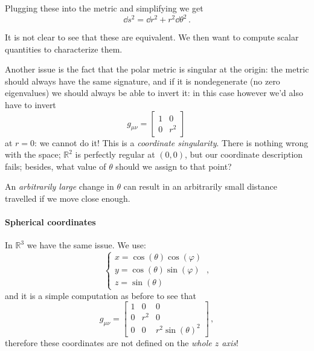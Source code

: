 \documentclass[main.tex]{subfiles}
\begin{document}
Plugging these into the metric and simplifying we get 
%
\begin{equation}
  \dd{s^2}  = \dd{r^2} + r^2 \dd{\theta^2} 
\,.
\end{equation}
%

It is not clear to see that these are equivalent.
We then want to compute scalar quantities to characterize them.

Another issue is the fact that the polar metric is singular at the origin: the metric should always have the same signature, and if it is nondegenerate (no zero eigenvalues) we should always be able to invert it: in this case however we'd also have to invert 
%
\begin{equation}
  g_{\mu \nu } = \left[\begin{array}{cc}
  1 & 0 \\ 
  0 & r^2
  \end{array}\right]
\,
\end{equation}
%
at \(r=0\): we cannot do it! This is a \emph{coordinate singularity}. There is nothing wrong with the space; \(\mathbb{R}^{2} \) is perfectly regular at \((0,0)\), but our coordinate description fails; besides, what value of \(\theta \) should we assign to that point? 

An \emph{arbitrarily large} change in \(\theta \) can result in an arbitrarily small distance travelled if we move close enough. 

\paragraph{Spherical coordinates}
In \(\mathbb{R}^3 \) we have the same issue. We use: 
%
\begin{equation}
  \begin{cases}
      x = \cos(\theta ) \cos(\varphi ) \\
      y = \cos(\theta ) \sin(\varphi)  \\
      z = \sin(\theta ) 
  \end{cases}
\,,
\end{equation}
%
and it is a simple computation as before to see that 
%
\begin{equation}
  g_{\mu \nu }= \left[\begin{array}{ccc}
  1 & 0 & 0 \\ 
  0 & r^2 & 0 \\ 
  0 & 0 & r^2 \sin(\theta )^2
  \end{array}\right]
\,,
\end{equation}
%
therefore these coordinates are not defined on the \emph{whole \(z\) axis}!
\end{document}
